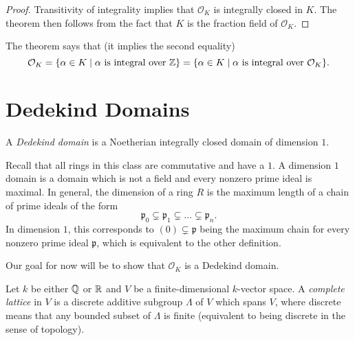 \begin{proof}
  Transitivity of integrality implies that $\mathcal{O}_K$
  is integrally closed in $K$. The theorem then
  follows from the fact that $K$ is the fraction field
  of $\mathcal{O}_K$.
\end{proof}

\begin{remark}
  The theorem says that (it implies the second equality)
  \[
    \mathcal{O}_K
    = \{\alpha \in K \mid \text{$\alpha$ is integral over $\mathbb{Z}$}\}
    = \{\alpha \in K \mid \text{$\alpha$ is integral over $\mathcal{O}_K$}\}.
  \]
\end{remark}

\section{Dedekind Domains}

\begin{definition}
  A \emph{Dedekind domain} is a Noetherian
  integrally closed domain of dimension $1$.
\end{definition}

\begin{remark}
  Recall that all rings in this class are commutative
  and have a $1$. A dimension $1$ domain is a domain
  which is not a field and every nonzero prime ideal
  is maximal. In general, the dimension of a ring $R$
  is the maximum length of a chain of prime ideals
  of the form
  \[
    \mathfrak{p}_0 \subsetneq \mathfrak{p}_1 \subsetneq \dots \subsetneq \mathfrak{p}_n.
  \]
  In dimension $1$, this corresponds to
  $(0) \subsetneq \mathfrak{p}$ being the maximum
  chain for every nonzero prime
  ideal $\mathfrak{p}$, which is equivalent to the
  other definition.
\end{remark}

\begin{remark}
  Our goal for now will be to show that $\mathcal{O}_K$
  is a Dedekind domain.
\end{remark}

\begin{definition}
  Let $k$ be either $\mathbb{Q}$ or $\mathbb{R}$ and
  $V$ be a finite-dimensional $k$-vector
  space. A \emph{complete lattice} in $V$ is a
  discrete additive subgroup $\Lambda$ of $V$ which
  spans $V$, where discrete means that any
  bounded subset of $\Lambda$ is finite (equivalent to
  being discrete in the sense of topology).
\end{definition}

